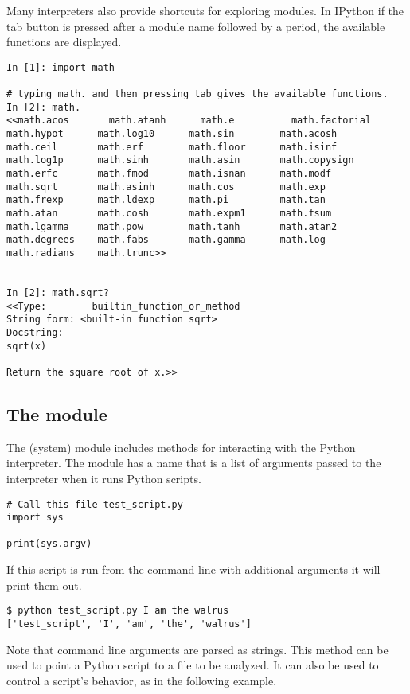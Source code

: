 Many interpreters also provide shortcuts for exploring modules.
In IPython if the tab button is pressed after a module name followed by a period, the available functions are displayed.

\begin{lstlisting}
In [1]: import math

# typing math. and then pressing tab gives the available functions.
In [2]: math.
<<math.acos       math.atanh      math.e          math.factorial  
math.hypot      math.log10      math.sin        math.acosh      
math.ceil       math.erf        math.floor      math.isinf      
math.log1p      math.sinh       math.asin       math.copysign   
math.erfc       math.fmod       math.isnan      math.modf       
math.sqrt       math.asinh      math.cos        math.exp        
math.frexp      math.ldexp      math.pi         math.tan        
math.atan       math.cosh       math.expm1      math.fsum       
math.lgamma     math.pow        math.tanh       math.atan2      
math.degrees    math.fabs       math.gamma      math.log        
math.radians    math.trunc>>


In [2]: math.sqrt?
<<Type:        builtin_function_or_method
String form: <built-in function sqrt>
Docstring:
sqrt(x)

Return the square root of x.>>
\end{lstlisting}

\subsection*{The  module}

The  (system) module includes methods for interacting with the Python interpreter.
The module has a name  that is a list of arguments passed to the interpreter when it runs Python scripts.

\begin{lstlisting}
# Call this file test_script.py
import sys

print(sys.argv)
\end{lstlisting}

If this script is run from the command line with additional arguments it will print them out.

\begin{lstlisting}
$ python test_script.py I am the walrus
['test_script', 'I', 'am', 'the', 'walrus']
\end{lstlisting}

Note that command line arguments are parsed as strings.
This method can be used to point a Python script to a file to be analyzed.
It can also be used to control a script's behavior, as in the following example.

